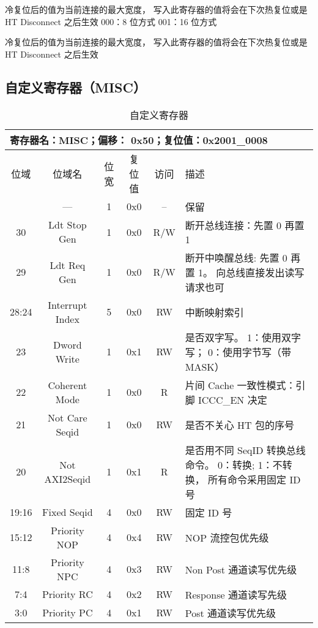 冷复位后的值为当前连接的最大宽度， 写入此寄存器的值将会在下次热复位或是 HT
Disconnect 之后生效 000：8 位方式 001：16 位方式

冷复位后的值为当前连接的最大宽度， 写入此寄存器的值将会在下次热复位或是 HT
Disconnect 之后生效

\subsection{自定义寄存器（MISC）}

\begin{table}[htbp]
  \centering
  \begin{tabular}{|c|c|c|c|c|p{7cm}|} \hline
    \multicolumn{6}{|l|}{寄存器名：MISC；偏移： 0x50；复位值：0x2001\_0008} \\ \hline
    位域  & 位域名   & 位宽 & 复位值 & 访问 & 描述 \\ \hhline
    31    & --- & 1 & 0x0 & --  & 保留 \\
    30    & Ldt Stop Gen    & 1 & 0x0 & R/W & 断开总线连接：先置 0 再置 1\\
    29    & Ldt Req Gen     & 1 & 0x0 & R/W & 断开中唤醒总线: 先置 0 再置 1。
    向总线直接发出读写请求也可 \\
    28:24 & Interrupt Index & 5 & 0x0 & RW & 中断映射索引 \\
    23    & Dword Write     & 1 & 0x1 & RW & 是否双字写。 1：使用双字写； 0：使用字节写（带 MASK） \\
    22    & Coherent Mode   & 1 & 0x0 & R  & 片间 Cache 一致性模式：引脚 ICCC\_EN 决定 \\
    21    & Not Care Seqid  & 1 & 0x0 & RW & 是否不关心 HT 包的序号 \\
    20    & Not AXI2Seqid   & 1 & 0x1 & R  & 是否用不同 SeqID 转换总线命令。
    0：转换; 1：不转换， 所有命令采用固定 ID 号 \\
    19:16 & Fixed Seqid     & 4 & 0x0 & RW & 固定 ID 号 \\
    15:12 & Priority NOP    & 4 & 0x4 & RW & NOP 流控包优先级 \\
    11:8  & Priority NPC    & 4 & 0x3 & RW & Non Post 通道读写优先级 \\
    7:4   & Priority RC     & 4 & 0x2 & RW & Response 通道读写先级 \\
    3:0   & Priority PC     & 4 & 0x1 & RW & Post 通道读写优先级 \\ \hline
  \end{tabular}
  \caption{自定义寄存器}
  \label{tab:misc}
\end{table}

